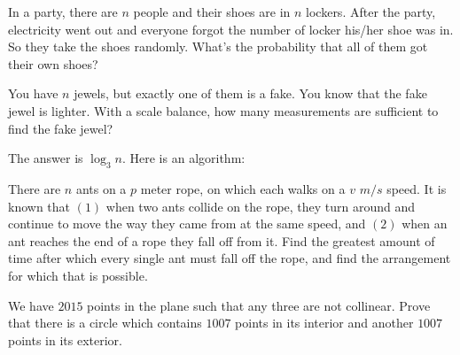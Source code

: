 \documentclass{subfile}
\begin{document}
		\begin{problem}
			In a party, there are $n$ people and their shoes are in $n$ lockers. After the party, electricity went out and everyone forgot the number of locker his/her shoe was in. So they take the shoes randomly. What's the probability that all of them got their own shoes?
		\end{problem}
		
		\begin{problem}
			You have $n$ jewels, but exactly one of them is a fake. You know that the fake jewel is lighter. With a scale balance, how many measurements are sufficient to find the fake jewel?
		\end{problem}
		
		\begin{solution}
			The answer is $\boxed{\log_3{n}}$. Here is an algorithm:
		\end{solution}
		
		\begin{problem}
			There are $n$ ants on a $p$ meter rope, on which each walks on a $v$ $m/s$ speed. It is known that $(1)$ when two ants collide on the rope, they turn around and continue to move the way they came from at the same speed, and $(2)$ when an ant reaches the end of a rope they fall off from it. Find the greatest amount of time after which every single ant must fall off the rope, and find
			the arrangement for which that is possible.
		\end{problem}
		
		\begin{problem}
			We have $2015$ points in the plane such that any three are not collinear. Prove that there is a circle which contains $1007$ points in its interior and another $1007$ points in its exterior.
		\end{problem}
		
\end{document}
